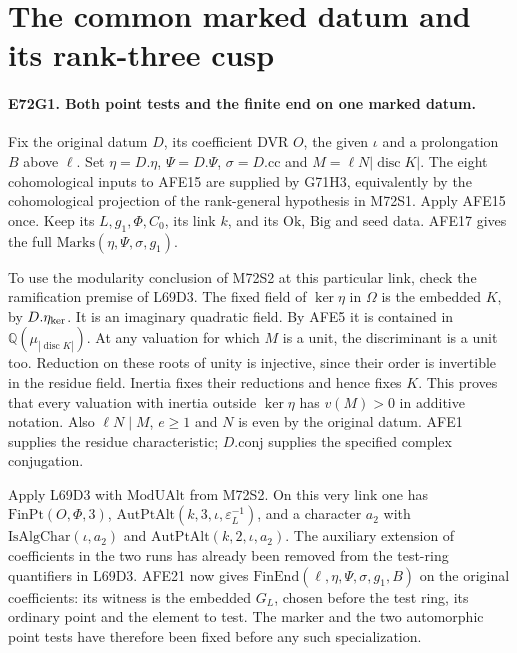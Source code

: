\section{The common marked datum and its rank-three cusp}

\paragraph{E72G1. Both point tests and the finite end on one marked datum.}
Fix the original datum $D$, its coefficient DVR $O$, the given
$\iota$ and a prolongation $B$ above $\ell$. Set
$\eta=D.\eta$, $\Psi=D.\Psi$, $\sigma=D.\mathrm{cc}$ and
$M=\ell N|\operatorname{disc}K|$. The eight cohomological inputs
to AFE15 are supplied by G71H3, equivalently by the cohomological
projection of the rank-general hypothesis in M72S1. Apply AFE15
once. Keep its $L,g_1,\Phi,C_0$, its link $k$, and its
$\mathrm{Ok}$, $\mathrm{Big}$ and seed data. AFE17 gives the full
$\mathrm{Marks}(\eta,\Psi,\sigma,g_1)$.

To use the modularity conclusion of M72S2 at this particular link,
check the ramification premise of L69D3. The fixed field of
$\ker\eta$ in $\Omega$ is the embedded $K$, by $D.\eta_{\rm ker}$.
It is an imaginary quadratic field. By AFE5 it is contained in
$\mathbb Q(\mu_{|\operatorname{disc}K|})$. At any valuation for
which $M$ is a unit, the discriminant is a unit too. Reduction on
these roots of unity is injective, since their order is invertible
in the residue field. Inertia fixes their reductions and hence
fixes $K$. This proves that every valuation with inertia outside
$\ker\eta$ has $v(M)>0$ in additive notation. Also $\ell N\mid M$,
$e\ge 1$ and $N$ is even by the original datum. AFE1 supplies the
residue characteristic; $D.\mathrm{conj}$ supplies the specified
complex conjugation.

Apply L69D3 with $\mathrm{ModUAlt}$ from M72S2. On this very link
one has $\mathrm{FinPt}(O,\Phi,3)$,
$\mathrm{AutPtAlt}(k,3,\iota,\varepsilon_L^{-1})$, and a character
$a_2$ with $\mathrm{IsAlgChar}(\iota,a_2)$ and
$\mathrm{AutPtAlt}(k,2,\iota,a_2)$. The auxiliary extension of
coefficients in the two runs has already been removed from the
test-ring quantifiers in L69D3. AFE21 now gives
$\mathrm{FinEnd}(\ell,\eta,\Psi,\sigma,g_1,B)$ on the original
coefficients: its witness is the embedded $G_L$, chosen before
the test ring, its ordinary point and the element to test. The
marker and the two automorphic point tests have therefore been
fixed before any such specialization.

